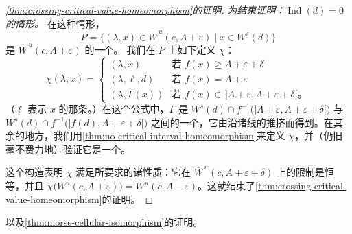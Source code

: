 \begin{proof}[\cref{thm:crossing-critical-value-homeomorphism}的证明]
\emph{为结束证明：$\operatorname{Ind}(d)=0$ 的情形。}
在这种情形，
\[
P=\bigl\{(\lambda,x)\in\overline{W}^{\,u}(c,A+\varepsilon)\mid x\in W^s(d)\bigr\}
\]
是 $\overline{W}^{\,u}(c,A+\varepsilon)$ 的一个\trConnectedComponent。
我们在 $P$ 上如下定义 $\chi$：
\[
\chi(\lambda,x)=
\begin{cases}
(\lambda,x) & \text{若 } f(x)\ge A+\varepsilon+\delta\\
(\lambda,\ell,d) & \text{若 } f(x)= A+\varepsilon\\
(\lambda,\varGamma(x)) & \text{若 } f(x)\in\,]A+\varepsilon,A+\varepsilon+\delta[\text{。}
\end{cases}
\]
（$\ell$ 表示 $x$ 的那条\trTrajectory。）在这个公式中，$\varGamma$ 是 $W^s(d)\cap f^{-1}\bigl(]A+\varepsilon,A+\varepsilon+\delta[\bigr)$ 与 $W^s(d)\cap f^{-1}\bigl(]f(d),A+\varepsilon+\delta[\bigr)$ 之间的一个\trDiffeomorphism，它由沿诸\trGradient{}线的推挤而得到。在其余的地方，我们用\cref{thm:no-critical-interval-homeomorphism}来定义 $\chi$，并（仍旧毫不费力地）验证它是一个\trHomeomorphism。

这个构造表明 $\chi$ 满足所要求的诸性质：它在 $\overline{W}^{\,u}(c,A+\varepsilon+\delta)$ 上的限制是恒等，并且 $\chi\bigl(W^u(c,A+\varepsilon)\bigr)=W^u(c,A-\varepsilon)$。这就结束了\cref{thm:crossing-critical-value-homeomorphism}的证明。
\end{proof}

以及\cref{thm:morse-cellular-isomorphism}的证明。

